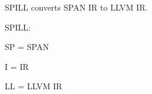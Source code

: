 S\+P\+I\+LL converts S\+P\+AN IR to L\+L\+VM IR.

S\+P\+I\+LL\+:
\begin{DoxyItemize}
\item SP = S\+P\+AN
\item I = IR
\item LL = L\+L\+VM IR 
\end{DoxyItemize}
